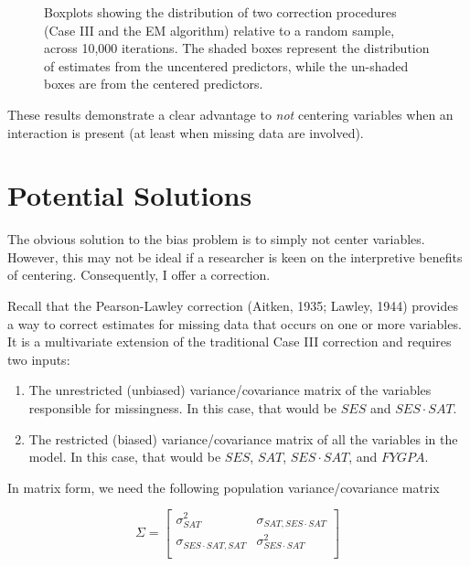 \documentclass[english,man]{apa6}
\providecommand{\tightlist}{%
  \setlength{\itemsep}{0pt}\setlength{\parskip}{0pt}}
\theoremstyle{definition}
\theoremstyle{definition}
\theoremstyle{remark}
\begin{document}
\begin{figure}[htbp]
\begin{center}
\caption{Boxplots showing the distribution of two correction procedures (Case III and the EM algorithm) relative to a random sample, across 10,000 iterations. The shaded boxes represent the distribution of estimates from the uncentered predictors, while the un-shaded boxes are from the centered predictors. }
\label{fig:demo}
\end{center}
\end{figure}

These results demonstrate a clear advantage to \emph{not} centering
variables when an interaction is present (at least when missing data are
involved).

\section{Potential Solutions}\label{potential-solutions}

The obvious solution to the bias problem is to simply not center
variables. However, this may not be ideal if a researcher is keen on the
interpretive benefits of centering. Consequently, I offer a correction.

Recall that the Pearson-Lawley correction (Aitken, 1935; Lawley, 1944)
provides a way to correct estimates for missing data that occurs on one
or more variables. It is a multivariate extension of the traditional
Case III correction and requires two inputs:

\begin{enumerate}
\def\labelenumi{(\arabic{enumi})}
\tightlist
\item
  The unrestricted (unbiased) variance/covariance matrix of the
  variables responsible for missingness. In this case, that would be
  \(SES\) and \(SES\cdot SAT\).
\item
  The restricted (biased) variance/covariance matrix of all the
  variables in the model. In this case, that would be \(SES\), \(SAT\),
  \(SES \cdot SAT\), and \(FYGPA\).
\end{enumerate}

In matrix form, we need the following population variance/covariance
matrix

\[
   \Sigma=
  \left[ {\begin{array}{ccc}
   \sigma^2_{SAT} & \sigma_{SAT,SES\cdot SAT} \\
    \sigma_{SES\cdot SAT, SAT} & \sigma^2_{SES \cdot SAT}  \\
  \end{array} } \right]
\]
\end{document}
